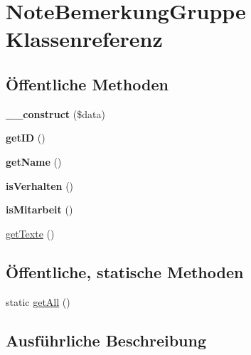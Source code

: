 \hypertarget{class_note_bemerkung_gruppe}{}\section{Note\+Bemerkung\+Gruppe Klassenreferenz}
\label{class_note_bemerkung_gruppe}
\subsection*{Öffentliche Methoden}
\begin{DoxyCompactItemize}
\item 
\mbox{\label{class_note_bemerkung_gruppe_ab0ce2d5ec52930fae7f20e2c21a06665}} 
{\bfseries \+\_\+\+\_\+construct} (\$data)
\item 
\mbox{\label{class_note_bemerkung_gruppe_a529cb31be054bc818cf736ba9b04222a}} 
{\bfseries get\+ID} ()
\item 
\mbox{\label{class_note_bemerkung_gruppe_a8b0119f2c5ab52c83d323e718a5cbf43}} 
{\bfseries get\+Name} ()
\item 
\mbox{\label{class_note_bemerkung_gruppe_a79bd67f288e54531c36e85b6e22a195d}} 
{\bfseries is\+Verhalten} ()
\item 
\mbox{\label{class_note_bemerkung_gruppe_a34663420692f27c463169ced219df459}} 
{\bfseries is\+Mitarbeit} ()
\item 
\mbox{\hyperlink{class_note_bemerkung_gruppe_a1815dda07a342042aee279d62da17d1e}{get\+Texte}} ()
\end{DoxyCompactItemize}
\subsection*{Öffentliche, statische Methoden}
\begin{DoxyCompactItemize}
\item 
static \mbox{\hyperlink{class_note_bemerkung_gruppe_a2bd0a9d8dd4b025d28fc0f2a7a01096f}{get\+All}} ()
\end{DoxyCompactItemize}


\subsection{Ausführliche Beschreibung}


